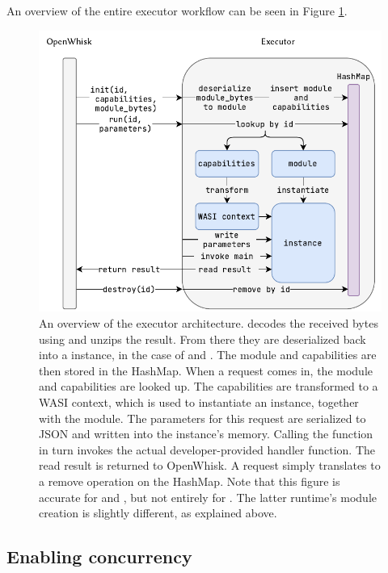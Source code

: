 An overview of the entire executor workflow can be seen in Figure \ref{fig:executor-overview}.

\begin{figure}
    \centering
    \includegraphics{figures/ExecutorOverview.pdf}
    \caption{An overview of the executor architecture.  decodes the received bytes using  and unzips the result. From there they are deserialized back into a  instance, in the case of  and . The module and capabilities are then stored in the HashMap. When a  request comes in, the module and capabilities are looked up. The capabilities are transformed to a WASI context, which is used to instantiate an instance, together with the module. The parameters for this  request are serialized to JSON and written into the instance's memory. Calling the  function in turn invokes the actual developer-provided handler function. The read result is returned to OpenWhisk. A  request simply translates to a remove operation on the HashMap. Note that this figure is accurate for  and , but not entirely for . The latter runtime's module creation is slightly different, as explained above.}
    \label{fig:executor-overview}
\end{figure}



\subsection{Enabling concurrency}

